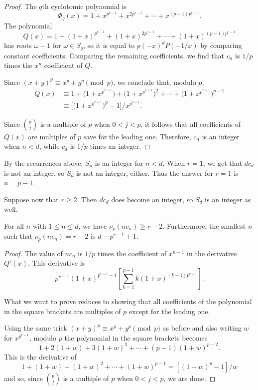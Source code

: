 \documentclass[11pt]{scrartcl}
\begin{document}
\begin{proof}
The $q$th cyclotomic polynomial is
\[\Phi_q(x)=1+x^{p^{r-1}}+x^{2p^{r-1}}+\dotsb+x^{(p-1)p^{r-1}}.\]
The polynomial
\[Q(x) = 1+(1+x)^{p^{r-1}}+(1+x)^{2p^{r-1}}+\dotsb+(1+x)^{(p-1)p^{r-1}}\]
has roots $\omega-1$ for $\omega \in S_q$, so it is equal to $p(-x)^dP(-1/x)$ by
comparing constant coefficients. Comparing the remaining coefficients, we find
that $c_n$ is $1/p$ times the $x^{n}$ coefficient of $Q$.

Since $(x + y)^p \equiv x^p + y^p \pmod{p}$, we conclude that, modulo $p$,
\begin{align*}
  Q(x) &\equiv 1 + \big(1 + x^{p^{r - 1}}\big) + \big(1 + x^{p^{r - 1}}\big)^2 + \dotsb + \big(1 + x^{p^{r -
1}}\big)^{p - 1} \\
       &\equiv \Big[\big(1 + x^{p^{r - 1}}\big)^p - 1\Big]/x^{p^{r - 1}}.
\end{align*}

Since $\binom{p}{j}$ is a multiple of $p$ when $0 < j < p$, it follows that all
coefficients of $Q(x)$ are multiples of $p$ save for the leading one. Therefore,
$c_n$ is an integer when $n < d$, while $c_d$ is $1/p$ times an integer.
\end{proof}

By the recurrences above, $S_n$ is an integer for $n < d$. When $r = 1$, we get
that $dc_d$ is not an integer, so $S_d$ is not an integer, either. Thus the
answer for $r=1$ is $n=p-1$.

Suppose now that $r \ge 2$. Then $dc_d$ does become an integer, so $S_d$ is an integer as well.


\begin{lemma*}
  For all $n$ with $1 \le n \le d$, we have $\nu_p(nc_n) \ge r - 2$.
  Furthermore, the smallest $n$ such that $\nu_p(nc_n) = r - 2$ is $d - p^{r - 1} +
  1$.
\end{lemma*}
\begin{proof}
  The value of $nc_n$ is $1/p$ times the coefficient of $x^{n-1}$ in the
  derivative $Q'(x)$. This derivative is
\[p^{r - 1}(1 + x)^{p^{r - 1} - 1}\left[\sum_{k = 1}^{p - 1} k(1 + x)^{(k - 1)p^{r -
1}}\right].\]

What we want to prove reduces to showing that all coefficients of the
polynomial in the square brackets are multiples of $p$ except for the leading one.

Using the same trick $(x + y)^p \equiv x^p + y^p \pmod{p}$ as before and also
writing $w$ for $x^{p^{r - 1}}$, modulo $p$ the polynomial in the square brackets
becomes
\[1 + 2(1 + w) + 3(1 + w)^2 + \dotsb + (p - 1)(1 + w)^{p - 2}.\]
This is the derivative of
\[1 + (1 + w) + (1 + w)^2 + \dotsb + (1 + w)^{p - 1} = [(1 + w)^p - 1]/w\]
and so, since $\binom{p}{j}$ is a multiple of $p$ when $0 < j < p$, we are
done.
\end{proof}
\end{document}
